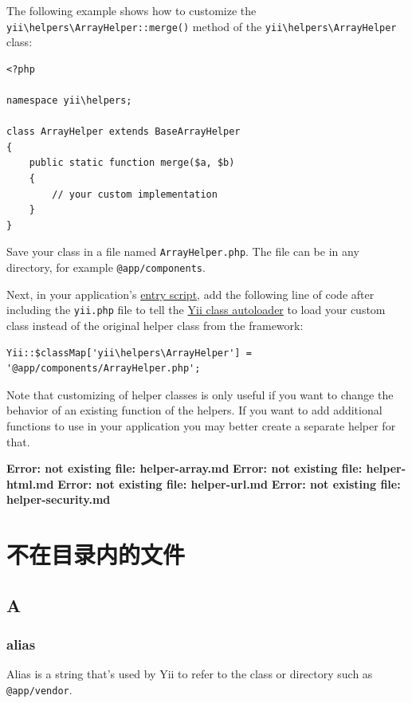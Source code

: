 The following example shows how to customize the \texttt{yii{\allowbreak{}\textbackslash}helpers{\allowbreak{}\textbackslash}ArrayHelper\allowbreak{}::\allowbreak{}merge()} method of the
\texttt{yii{\allowbreak{}\textbackslash}helpers{\allowbreak{}\textbackslash}ArrayHelper} class:

\lstset{language=php}\begin{lstlisting}
<?php

namespace yii\helpers;

class ArrayHelper extends BaseArrayHelper
{
    public static function merge($a, $b)
    {
        // your custom implementation
    }
}
\end{lstlisting}
Save your class in a file named \lstinline|ArrayHelper.php|. The file can be in any directory, for example \lstinline|@app/components|.

Next, in your application's \hyperref[structure-entry-scripts.md]{entry script}, add the following line of code
after including the \lstinline|yii.php| file to tell the \hyperref[concept-autoloading.md]{Yii class autoloader} to load your custom
class instead of the original helper class from the framework:

\lstset{language=php}\begin{lstlisting}
Yii::$classMap['yii\helpers\ArrayHelper'] = '@app/components/ArrayHelper.php';
\end{lstlisting}
Note that customizing of helper classes is only useful if you want to change the behavior of an existing function
of the helpers. If you want to add additional functions to use in your application you may better create a separate
helper for that.



\newpage\label{helper-array.md}\textbf{Error: not existing file: helper-array.md}\newpage
\newpage\label{helper-html.md}\textbf{Error: not existing file: helper-html.md}\newpage
\newpage\label{helper-url.md}\textbf{Error: not existing file: helper-url.md}\newpage
\newpage\label{helper-security.md}\textbf{Error: not existing file: helper-security.md}\newpage
\chapter{不在目录内的文件}
\label{glossary.md}\section{A}
\subsection{alias}
Alias is a string that's used by Yii to refer to the class or directory such as \lstinline|@app/vendor|.


